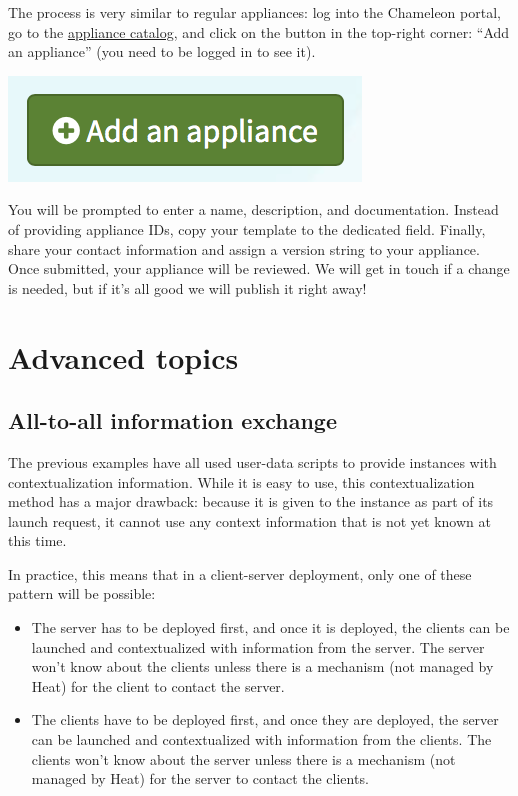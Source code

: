 The process is very similar to regular appliances: log into the
Chameleon portal, go to the
\href{https://www.chameleoncloud.org/appliances/}{appliance catalog},
and click on the button in the top-right corner: ``Add an appliance''
(you need to be logged in to see it).

\includegraphics[width=0.25\columnwidth]{images/chameleon/Add-an-appliance.png}

You will be prompted to enter a name, description, and documentation.
Instead of providing appliance IDs, copy your template to the dedicated
field. Finally, share your contact information and assign a version
string to your appliance. Once submitted, your appliance will be
reviewed. We will get in touch if a change is needed, but if it's all
good we will publish it right away!

\section{Advanced topics}\label{advanced-topics}

\subsection{All-to-all information
exchange}\label{all-to-all-information-exchange}

The previous examples have all used user-data scripts to provide
instances with contextualization information. While it is easy to use,
this contextualization method has a major drawback: because it is given
to the instance as part of its launch request, it cannot use any context
information that is not yet known at this time.

In practice, this means that in a client-server deployment, only one of
these pattern will be possible:

\begin{itemize}
\item
  The server has to be deployed first, and once it is deployed, the
  clients can be launched and contextualized with information from the
  server. The server won't know about the clients unless there is a
  mechanism (not managed by Heat) for the client to contact the server.
\item
  The clients have to be deployed first, and once they are deployed, the
  server can be launched and contextualized with information from the
  clients. The clients won't know about the server unless there is a
  mechanism (not managed by Heat) for the server to contact the clients.
\end{itemize}

